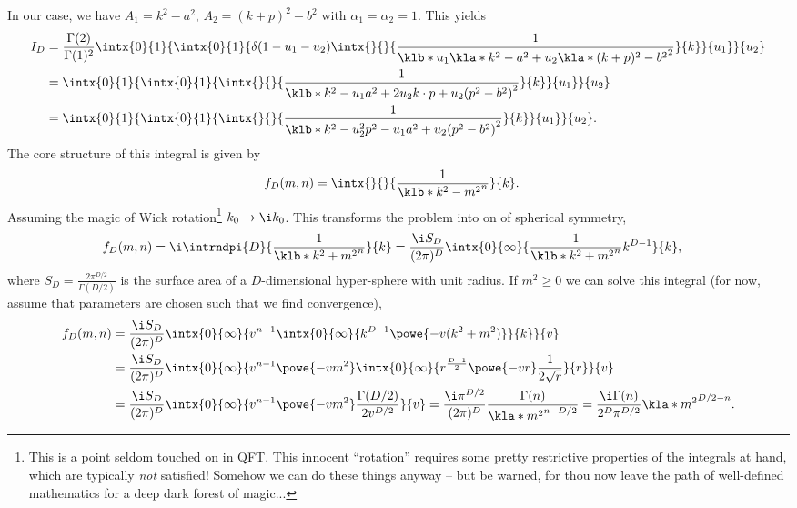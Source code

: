 \documentclass[english, parskip=full]{scrartcl}
\begin{document}
In our case, we have $A_1=k^2-a^2$, $A_2=(k+p)^2-b^2$ with $\alpha_1=\alpha_2=1$.
This yields
\begin{align}
I_D &= \frac{\Gamma(2)}{\Gamma(1)^2} \intx{0}{1}{ \intx{0}{1}{ \delta(1-u_1-u_2) \intx{ }{ }{\frac{1}{\klb*{u_1 \kla*{k^2 - a^2} + u_2 \kla*{(k+p)^2 - b^2}}^2 }}{k}  }{u_1}}{u_2}\\
&= \intx{0}{1}{\intx{0}{1}{\intx{ }{ }{\frac{1}{ \klb*{k^2 - u_1a^2 + 2u_2k\cdot p + u_2(p^2-b^2)}^2 }}{k} }{u_1}}{u_2}\\
&= \intx{0}{1}{\intx{0}{1}{\intx{ }{ }{\frac{1}{ \klb*{k^2 - u_2^2p^2 - u_1a^2 + u_2(p^2-b^2)}^2 }}{k} }{u_1}}{u_2}.
\end{align}
The core structure of this integral is given by
\begin{align}
f_D(m,n) &= \intx{ }{ }{\frac{1}{\klb*{k^2 - m^2}^n}}{k}.
\end{align}
Assuming the magic of Wick rotation\footnote{This is a point seldom touched on in QFT. This innocent ``rotation'' requires some pretty restrictive properties of the integrals at hand, which are typically \emph{not} satisfied! Somehow we can do these things anyway -- but be warned, for thou now leave the path of well-defined mathematics for a deep dark forest of magic...} $k_0 \rightarrow \i k_0$.
This transforms the problem into on of spherical symmetry,
\begin{align}
f_D(m,n) &= \i\intrndpi{D}{ \frac{1}{\klb*{k^2 + m^2}^n} }{k} = \frac{\i S_D}{(2\pi)^D} \intx{0}{\infty}{ \frac{1}{\klb*{k^2 + m^2}^n} k^{D-1}}{k},
\end{align}
where $S_D= \frac{2\pi^{D/2}}{\Gamma(D/2)}$ is the surface area of a $D$-dimensional hyper-sphere with unit radius.
If $m^2\ge 0$ we can solve this integral (for now, assume that parameters are chosen such that we find convergence),
\begin{align}
f_D(m,n) &= \frac{\i S_D}{(2\pi)^D} \intx{0}{\infty}{v^{n-1} \intx{0}{\infty}{k^{D-1} \powe{-v(k^2+m^2)}}{k} }{v}\\
&= \frac{\i S_D}{(2\pi)^D} \intx{0}{\infty}{v^{n-1} \powe{-vm^2} \intx{0}{\infty}{r^{\frac{D-1}{2}} \powe{-vr} \frac{1}{2\sqrt{r}} }{r} }{v}\\
&= \frac{\i S_D}{(2\pi)^D} \intx{0}{\infty}{v^{n-1} \powe{-vm^2} \frac{\Gamma(D/2)}{2v^{D/2}} }{v} = \frac{\i \pi^{D/2}}{(2\pi)^D} \frac{\Gamma(n)}{\kla*{m^2}^{n - D/2}} = \frac{\i\Gamma(n)}{2^D \pi^{D/2}} \kla*{m^2}^{D/2 - n}.
\end{align}
\end{document}
